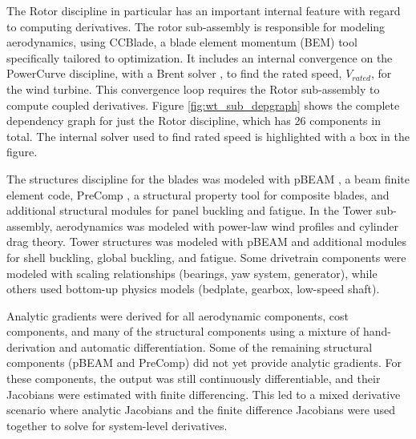 \documentclass[]{aiaa-tc} %
\begin{document}
    The Rotor discipline in particular has an important internal feature with regard to computing derivatives. 
    The rotor sub-assembly is responsible for modeling aerodynamics, using CCBlade\cite{NING:BEM}, 
    a blade element momentum (BEM) tool specifically tailored to optimization. It includes 
    an internal convergence on the PowerCurve discipline, with a Brent solver \cite{Brent1971}, to find the 
    rated speed, $V_{rated}$, for the wind turbine. This convergence loop requires the Rotor 
    sub-assembly to compute coupled derivatives. Figure \ref{fig:wt_sub_depgraph} shows the complete 
    dependency graph for just the Rotor discipline, which has 26 components in total.  The internal solver used to find rated speed is highlighted with a box in the figure. 

    The structures discipline for the blades was modeled with pBEAM \cite{Ning2013b},
    a beam finite element code, PreComp \cite{Bir2005}, a structural property tool for
    composite blades, and additional structural modules for panel buckling and fatigue. In the Tower sub-assembly, 
    aerodynamics was modeled with power-law wind profiles and cylinder drag theory.
    Tower structures was modeled with pBEAM and additional modules for shell buckling,
    global buckling, and fatigue.  Some drivetrain components were modeled with scaling
    relationships (bearings, yaw system, generator), while others used bottom-up physics
    models (bedplate, gearbox, low-speed shaft).

    Analytic gradients were derived for all aerodynamic components, cost components, and many of the structural components using a mixture of hand-derivation and automatic differentiation.  Some of the remaining structural components (pBEAM and PreComp) did not yet provide analytic gradients.  For these components, the output was still continuously differentiable, and their Jacobians were estimated with finite differencing.  This led to a mixed derivative scenario where analytic Jacobians and the finite difference Jacobians were used together to solve for system-level derivatives.



\end{document}
